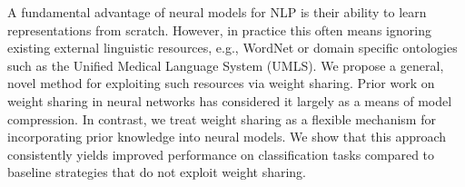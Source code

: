 A fundamental advantage of neural models for NLP is their ability to learn representations from scratch. However, in practice this often means ignoring existing external linguistic resources, e.g., WordNet or domain specific ontologies such as the Unified Medical Language System (UMLS). We propose a general, novel method for exploiting such resources via weight sharing. Prior work on weight sharing in neural networks has considered it largely as a means of model compression. In contrast, we treat weight sharing as a flexible mechanism for incorporating prior knowledge into neural models. We show that this approach consistently yields improved performance on classification tasks compared to baseline strategies that do not exploit weight sharing.
